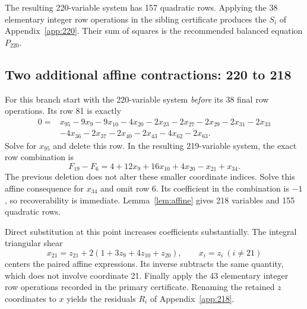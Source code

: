 \documentclass[10pt,letterpaper]{article}
\theoremstyle{definition}\newtheorem{definition}[theorem]{Definition}
\begin{document}
The resulting 220-variable system has 157 quadratic rows. Applying the
38 elementary integer row operations in the sibling certificate produces
the $S_i$ of Appendix~\ref{app:220}. Their sum of squares is the
recommended balanced equation $P_{220}$.

\subsection{Two additional affine contractions: 220 to 218}
For this branch start with the 220-variable system \emph{before} its
38 final row operations. Its row 81 is exactly
\begin{align*}
0={}&x_{95}-9x_9-9x_{10}-4x_{20}-2x_{23}-2x_{27}-2x_{29}
      -2x_{31}-2x_{33}\\
 &-4x_{36}-2x_{37}-2x_{40}-2x_{43}-4x_{62}-2x_{63}.
\end{align*}
Solve for $x_{95}$ and delete this row. In the resulting 219-variable
system, the exact row combination is
\[
F_{19}-F_6=4+12x_9+16x_{10}+4x_{20}-x_{21}+x_{34}.
\]
The previous deletion does not alter these smaller coordinate indices.
Solve this affine consequence for $x_{34}$ and omit row 6. Its coefficient
in the combination is $-1$, so recoverability is immediate.
Lemma~\ref{lem:affine} gives 218 variables and 155 quadratic rows.

Direct substitution at this point increases coefficients substantially.
The integral triangular shear
\begin{equation}\label{eq:center}
x_{21}=z_{21}+2(1+3z_9+4z_{10}+z_{20}),\qquad x_i=z_i\ (i\ne21)
\end{equation}
centers the paired affine expressions. Its inverse subtracts the same
quantity, which does not involve coordinate 21. Finally apply the
43 elementary integer row operations recorded in the primary certificate.
Renaming the retained $z$ coordinates to $x$ yields the residuals $R_i$
of Appendix~\ref{app:218}.
\end{document}
